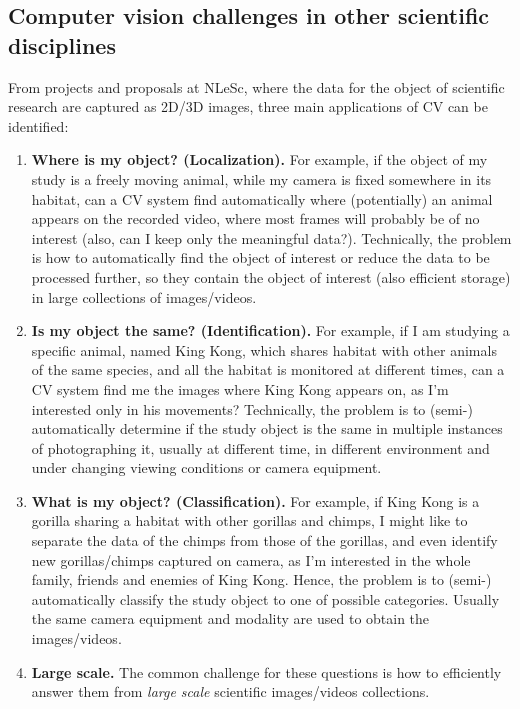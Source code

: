 \subsection{Computer vision challenges in other scientific disciplines}
From projects and proposals at NLeSc, where the data for the object of scientific research are captured as 2D/3D images, three main applications of CV can be identified:
\begin{enumerate}
\item {\bf Where is my object? (Localization).} For example, if the object of my study is a freely moving animal, while my camera is fixed somewhere in its habitat, can a CV system find automatically where (potentially) an animal appears on the recorded video, where most frames will probably be of no interest (also, can I keep only the meaningful data?). Technically, the problem is how to automatically find the object of interest or reduce the data to be processed further, so they contain the object of interest (also efficient storage) in large collections of images/videos.
\item {\bf Is my object the same? (Identification).} For example, if I am studying a specific animal, named King Kong, which shares habitat with other animals of the same species, and all the habitat is monitored at different times, can a CV system find me the images where King Kong appears on, as I'm interested only in his movements? Technically, the problem is to (semi-) automatically determine if the study object is the same in multiple instances of photographing it, usually at different time, in different environment and under changing viewing conditions or camera equipment.
\item {\bf What is my object? (Classification).} For example, if King Kong is a gorilla sharing a habitat with other gorillas and chimps, I might like to separate the data of the chimps from those of the gorillas, and even identify new gorillas/chimps captured on camera, as I'm interested in the whole family, friends and enemies of King Kong. Hence, the problem is to (semi-) automatically classify the study object to one of possible categories. Usually the same camera equipment and modality are used to obtain the images/videos.
\item{\bf Large scale.} The common challenge for these questions is how to efficiently answer them from {\em large scale} scientific images/videos collections.
\end{enumerate}

